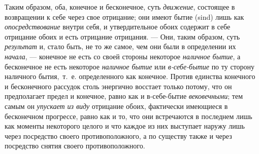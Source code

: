 Таким образом, оба, конечное и бесконечное, суть
{\em движение}, состоящее в возвращении к себе через
свое отрицание; они имеют бытие (sind) лишь как
{\em опосредствование} внутри себя, и утвердительное
обоих содержит в себе отрицание обоих и есть отрицание отрицания. — Они,
таким образом, суть {\em результат} и, стало быть, не
то же самое, чем они были в определении их
{\em начала}, — конечное не есть со своей стороны
некоторое {\em наличное бытие}, а бесконечное не есть
некоторое {\em наличное бытие} или
{\em в-себе-бытие} по ту сторону наличного бытия,~т.~е.
определенного как конечное. Против единства конечного и бесконечного
рассудок столь энергично восстает только потому, что он предполагает предел
и конечное, равно как и в-себе-бытие {\em вековечными};
тем самым он {\em упускает из виду} отрицание обоих,
фактически имеющиеся в бесконечном прогрессе, равно как и то, что они
встречаются в последнем лишь как моменты некоторого целого и что каждое из
них выступает наружу лишь через посредство своего противоположного, а по
существу также и через посредство снятия своего противоположного.

